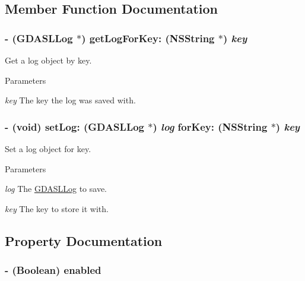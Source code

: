 \subsection{Member Function Documentation}
\hypertarget{interface_g_d_a_s_l_log_manager_ab8b36b60188da8c5faa9bfaccbeeafae}{
\subsubsection[{getLogForKey:}]{\setlength{\rightskip}{0pt plus 5cm}-\/ ({\bf GDASLLog} $\ast$) getLogForKey: ({\bf NSString} $\ast$) {\em key}}}
\label{interface_g_d_a_s_l_log_manager_ab8b36b60188da8c5faa9bfaccbeeafae}


Get a log object by key. 
\begin{DoxyParams}{Parameters}
\item[{\em key}]The key the log was saved with. \end{DoxyParams}
\hypertarget{interface_g_d_a_s_l_log_manager_a8c4c1b87584a9091f02c263ef2396937}{
\subsubsection[{setLog:forKey:}]{\setlength{\rightskip}{0pt plus 5cm}-\/ (void) setLog: ({\bf GDASLLog} $\ast$) {\em log}\/ forKey: ({\bf NSString} $\ast$) {\em key}}}
\label{interface_g_d_a_s_l_log_manager_a8c4c1b87584a9091f02c263ef2396937}


Set a log object for key. 
\begin{DoxyParams}{Parameters}
\item[{\em log}]The \hyperlink{interface_g_d_a_s_l_log}{GDASLLog} to save. \item[{\em key}]The key to store it with. \end{DoxyParams}


\subsection{Property Documentation}
\hypertarget{interface_g_d_a_s_l_log_manager_ad294e2a3caeb036f104d65b4c477820a}{
\subsubsection[{enabled}]{\setlength{\rightskip}{0pt plus 5cm}-\/ (Boolean) enabled}}
\label{interface_g_d_a_s_l_log_manager_ad294e2a3caeb036f104d65b4c477820a}


